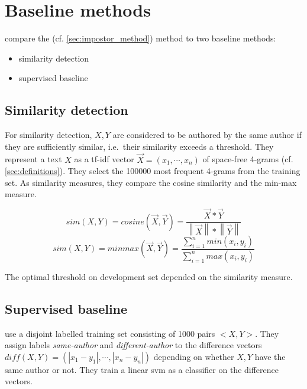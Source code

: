 \section{Baseline methods}
\label{sec:impostor_baseline_methods}

\citet{koppel_determining_2014} compare the \imp{} (cf. \autoref{sec:impostor_method}) method to two baseline methods:
\begin{itemize}
    \item similarity detection
    \item supervised baseline
\end{itemize}


\subsection{Similarity detection}
\label{sec:imp_similarity_detection}

For similarity detection, $X,Y$ are considered to be authored by the same author if they are sufficiently similar, 
i.e.\ their similarity exceeds a threshold.
They represent a text $X$ as a tf-idf vector $\overrightarrow{X}= (x_1, \cdots , x_n)$ 
of space-free 4-grams (cf. \autoref{sec:definitions}).
They select the 100000 most frequent 4-grams from the training set.
As similarity measures, they compare the cosine similarity and the min-max measure.

$$sim(X,Y)=cosine(\overrightarrow{X},\overrightarrow{Y})=\frac{\overrightarrow{X}*\overrightarrow{Y}}{\left\| \overrightarrow{X} \right\|*\left\| \overrightarrow{Y} \right\|}$$
$$sim(X,Y)=minmax(\overrightarrow{X},\overrightarrow{Y})=\frac{\sum_{i=1}^{n}min(x_i,y_i)}{\sum_{i=1}^{n}max(x_i,y_i)}$$

The optimal threshold on \citet{koppel_determining_2014} development set depended on the similarity measure.


\subsection{Supervised baseline}
\label{sec:imp_supervised_baseline}

\citet{koppel_determining_2014} use a disjoint labelled training set consisting of 1000 pairs $<X,Y>$.
They assign labels \textit{same-author} and \textit{different-author} 
to the difference vectors $diff(X,Y)= (\left| x_1-y_1 \right|, \cdots , \left| x_n-y_n \right|)$ 
depending on whether $X,Y$ have the same author or not.
They train a linear \ac{svm} as a classifier on the difference vectors.

